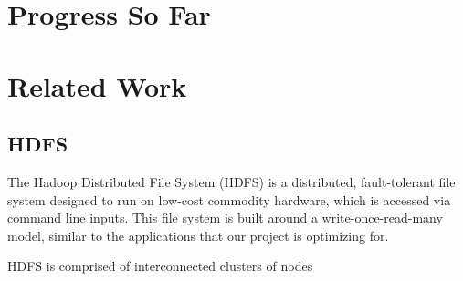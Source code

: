 \documentclass{article}
\begin{document}
\section{Progress So Far}


\section{Related Work}
\subsection{HDFS}
The Hadoop Distributed File System (HDFS) is a distributed, fault-tolerant file system designed to run on low-cost commodity hardware, which is accessed via command line inputs. This file system is built around a write-once-read-many model, similar to the applications that our project is optimizing for.

HDFS is comprised of interconnected clusters of nodes 
\end{document}
